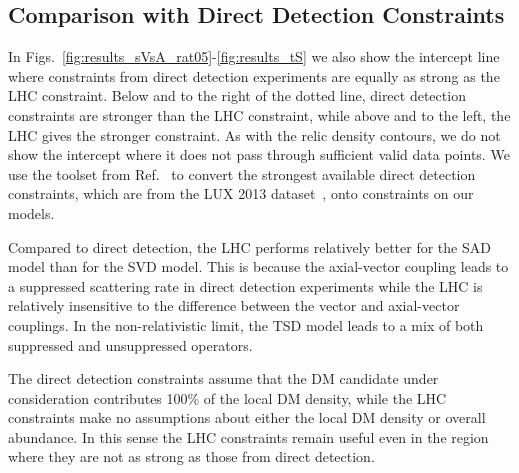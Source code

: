 \subsection{Comparison with Direct Detection Constraints}

In Figs.~\ref{fig:results_sVsA_rat05}-\ref{fig:results_tS} we also show the intercept line where constraints from  direct detection experiments are equally as strong as the LHC constraint. Below and to the right of the dotted line, direct detection constraints are stronger than the LHC constraint, while above and to the left, the LHC gives the stronger constraint. As with the relic density contours, we do not show the intercept where it does not pass through sufficient valid data points. We use the toolset from Ref.~\cite{DelNobile:2013sia} to convert the strongest available direct detection constraints, which are from the LUX 2013 dataset~\cite{Akerib:2013tjd}, onto constraints on our models.

Compared to direct detection, the LHC performs relatively better for the SAD model than for the SVD model. This is because the axial-vector coupling leads to a suppressed scattering rate in direct detection experiments while the LHC is relatively insensitive to the difference between the vector and axial-vector couplings. In the non-relativistic limit, the TSD model leads to a mix of both suppressed and unsuppressed operators.

The direct detection constraints assume that the DM candidate under consideration contributes 100\% of the local DM density, while the LHC constraints make no assumptions about either the local DM density or overall abundance. In this sense the LHC constraints remain useful even in the region where they are not as strong as those from direct detection.
